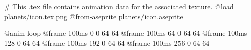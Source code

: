 # This .tex file contains animation data for the associated texture.
@load planets/icon.tex.png
@from-aseprite planets/icon.aseprite

@anim loop
	@frame 100ms 0 0 64 64
	@frame 100ms 64 0 64 64
	@frame 100ms 128 0 64 64
	@frame 100ms 192 0 64 64
	@frame 100ms 256 0 64 64
